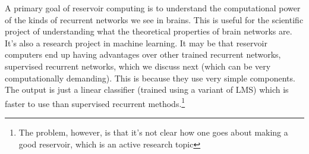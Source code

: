 A primary goal of reservoir computing is to understand the computational power of the kinds of recurrent networks we see in brains. This is useful for the scientific project of understanding what the theoretical properties of brain networks are. It's also a research project in machine learning. It may be that reservoir computers end up having advantages over other trained recurrent networks, \eg supervised recurrent networks, which we discuss next (which can be very computationally demanding). This is because they use very simple components. The output is just a linear classifier (trained using a variant of LMS) which is faster to use than supervised recurrent methods.\footnote{The problem, however, is that it's not clear how one goes about making a good reservoir, which is an active research topic}

